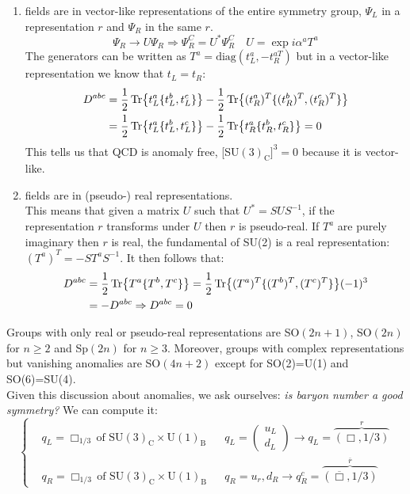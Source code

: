\documentclass[../main.tex]{subfiles}
\begin{document}
\begin{enumerate}
    \item fields are in vector-like representations of the entire symmetry group, $\Psi_L$ in a representation $r$ and $\Psi_R$ in the same $r$.
    \[
    \Psi_R\to U\Psi_R\Rightarrow\Psi_R^C=U^*\Psi_R^C \quad U=\exp{i\alpha^aT^a}
    \]
    The generators can be written as $T^a=\text{diag}(t_L^a, -t_R^{aT})$ but in a vector-like representation we know that $t_L=t_R$:
    \begin{align*}
    D^{abc}&=\frac{1}{2}\Tr{t_L^a\{t_L^b,t_L^c\}}-\frac{1}{2}\Tr{(t_R^a)^T\{(t_R^b)^T,(t_R^c)^T\}}\\
    &=\frac{1}{2}\Tr{t_L^a\{t_L^b,t_L^c\}}-\frac{1}{2}\Tr{t_R^a\{t_R^b,t_R^c\}}=0
    \end{align*}
    This tells us that QCD is anomaly free, [SU$(3)_{\text{C}}]^3=0$ because it is vector-like.
    \item fields are in (pseudo-) real representations.\\
    This means that given a matrix $U$ such that $U^*=SUS^{-1}$, if the representation $r$ transforms under $U$ then $r$ is pseudo-real. If $T^a$ are purely imaginary then $r$ is real, the fundamental of SU(2) is a real representation: $(T^a)^T=-ST^aS^{-1}$. It then follows that:
    \begin{align*}
    D^{abc}&=\frac{1}{2}\Tr{T^a\{T^b,T^c\}}=\frac{1}{2}\Tr{(T^a)^T\{(T^b)^T,(T^c)^T\}}(-1)^3\\
    &=-D^{abc}\Rightarrow D^{abc}=0
    \end{align*}
\end{enumerate}
Groups with only real or pseudo-real representations are SO$(2n+1)$, SO$(2n)$ for $n\ge2$ and Sp$(2n)$ for $n\ge3$. Moreover, groups with complex representations but vanishing anomalies are SO$(4n+2)$ except for SO(2)=U(1) and SO(6)=SU(4).\\
Given this discussion about anomalies, we ask ourselves: \textit{is baryon number a good symmetry?} We can compute it:
\[
\left\{
\begin{aligned}
&q_L=\Box_{1/3}\,\text{of SU$(3)_{\text{C}}\times$U$(1)_{\text{B}}$} &&q_L=\begin{pmatrix}u_L\\d_L\end{pmatrix}\to q_L=\overbrace{(\Box,1/3)}^{r}\\
&q_R=\Box_{1/3}\,\text{of SU$(3)_{\text{C}}\times$U$(1)_{\text{B}}$} &&q_R=u_r,d_R\to q_R^c=\overbrace{(\overline{\Box},1/3)}^{\overline{r}}
\end{aligned}
\right.
\]
\end{document}
